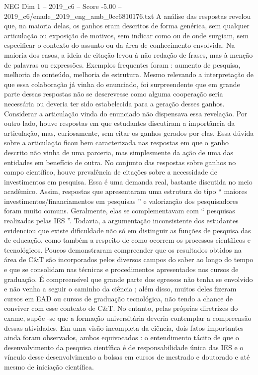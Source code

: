 \begin{textsample}{NEG Dim 1 – 2019\_c6 – Score -5.00 – 2019\_c6/enade\_2019\_eng\_amb\_0cc6810176.txt}
A análise das respostas revelou que, na maioria delas, os ganhos eram descritos de forma genérica, sem qualquer articulação ou exposição de motivos, sem indicar como ou de onde surgiam, sem especificar o contexto do assunto ou da área de conhecimento envolvida.
Na maioria dos casos, a ideia de citação levou à não redação de frases, mas à menção de palavras ou expressões.
Exemplos frequentes foram : aumento de pesquisa, melhoria de conteúdo, melhoria de estrutura.
Mesmo relevando a interpretação de que essa colaboração já vinha do enunciado, foi surpreendente que em grande parte dessas respostas não se descrevesse como alguma cooperação seria necessária ou deveria ter sido estabelecida para a geração desses ganhos.
Considerar a articulação vinda do enunciado não dispensava essa revelação.
Por outro lado, houve respostas em que estudantes discutiram a importância da articulação, mas, curiosamente, sem citar os ganhos gerados por elas.
Essa dúvida sobre a articulação ficou bem caracterizada nas respostas em que o ganho descrito não vinha de uma parceria, mas simplesmente da ação de uma das entidades em benefício de outra.
No conjunto das respostas sobre ganhos no campo científico, houve prevalência de citações sobre a necessidade de investimentos em pesquisa.
Essa é uma demanda real, bastante discutida no meio acadêmico.
Assim, respostas que apresentaram uma estrutura do tipo “ maiores investimentos/financiamentos em pesquisas ” e valorização dos pesquisadores foram muito comuns.
Geralmente, elas se complementavam com “ pesquisas realizadas pelas IES ”.
Todavia, a argumentação inconsistente dos estudantes evidenciou que existe dificuldade não só em distinguir as funções de pesquisa das de educação, como também a respeito de como ocorrem os processos científicos e tecnológicos.
Poucos demonstraram compreender que os resultados obtidos na área de C\&T são incorporados pelos diversos campos do saber ao longo do tempo e que se consolidam nas técnicas e procedimentos apresentados nos cursos de graduação.
É compreensível que grande parte dos egressos não tenha se envolvido e não venha a seguir o caminho da ciência ; além disso, muitos deles fizeram cursos em EAD ou cursos de graduação tecnológica, não tendo a chance de conviver com esse contexto de C\&T.
No entanto, pelas próprias diretrizes do exame, supõe -se que a formação universitária deveria contemplar a compreensão dessas atividades.
Em uma visão incompleta da ciência, dois fatos importantes ainda foram observados, ambos equivocados : o entendimento tácito de que o desenvolvimento da pesquisa científica é de responsabilidade única das IES e o vínculo desse desenvolvimento a bolsas em cursos de mestrado e doutorado e até mesmo de iniciação científica.

\end{textsample}
